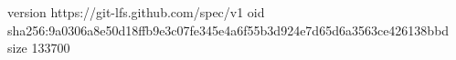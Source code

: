 version https://git-lfs.github.com/spec/v1
oid sha256:9a0306a8e50d18ffb9e3c07fe345e4a6f55b3d924e7d65d6a3563ce426138bbd
size 133700

